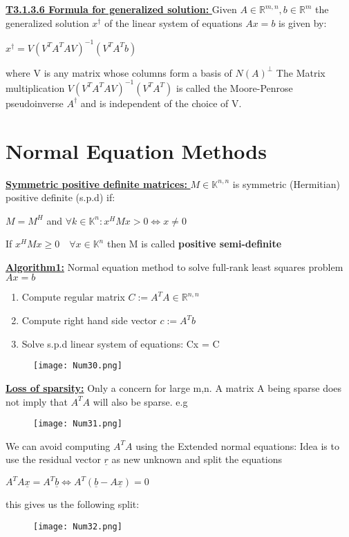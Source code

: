 \documentclass[8pt]{extreport}
\begin{document}
\underline{\textbf{T3.1.3.6 Formula for generalized solution: }} Given $A \in \mathbb{R}^{m,n}, b \in \mathbb{R}^m$ the generalized solution $x^{\dagger}$ of the linear system of equations $Ax=b$ is given by:
\begin{center}
$x^{\dagger} = V(V^{T}A^{T}AV)^{-1}(V^{T}A^{T}b)$
\end{center} 
where V is any matrix whose columns form a basis of $N(A)^\bot$
The Matrix multiplication $V(V^{T}A^{T}AV)^{-1}(V^{T}A^{T})$ is called the Moore-Penrose pseudoinverse $A^\dagger$ and is independent of the choice of V.

\section{Normal Equation Methods}

\underline{\textbf{Symmetric positive definite matrices: }} $M \in \mathbb{K}^{n,n}$ is symmetric (Hermitian) positive definite (s.p.d) if:
\begin{center}
$M =M ^H$ and $\forall k \in \mathbb{K}^{n}: x^HMx > 0 \iff x \neq 0$
\end{center}
If $x^HMx \geq 0 \quad \forall x \in \mathbb{K}^n$ then M is called \textbf{positive semi-definite}

\underline{\textbf{Algorithm1:}} Normal equation method to solve full-rank least squares problem $Ax=b$
\begin{enumerate}
\item Compute regular matrix $C:= A^TA \in \mathbb{R}^{n,n}$
\item Compute right hand side vector $c:= A^Tb$
\item Solve s.p.d linear system of equations: Cx = C
\end{enumerate}
\begin{figure}[H]
\centering
\texttt{[image: Num30.png]}
\end{figure}

\underline{\textbf{Loss of sparsity:}} Only a concern for large m,n. A matrix A being sparse does not imply that $A^TA$ will also be sparse. e.g
\begin{figure}[H]
\centering
\texttt{[image: Num31.png]}
\end{figure}

We can avoid computing $A^TA$ using the Extended normal equations:
Idea is to use the residual vector $\underline{r}$ as new unknown and split the equations
\begin{center}
$A^TA\underline{x} = A^T\underline{b} \iff A^T(\underline{b} - A \underline{x}) = 0$
\end{center}
this gives us the following split:
\begin{figure}[H]
\centering
\texttt{[image: Num32.png]}
\end{figure}
\end{document}
